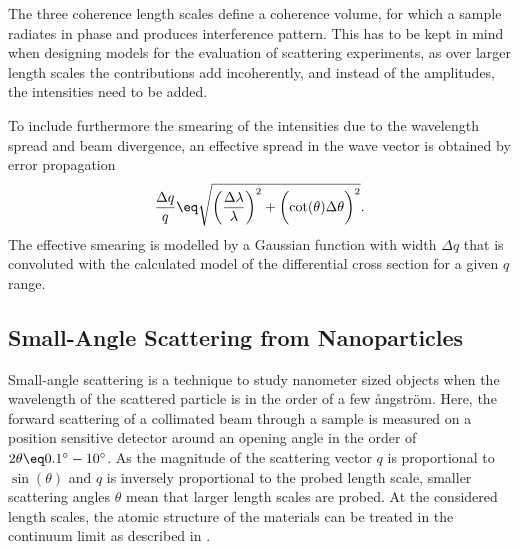 \documentclass[\main/dresen_thesis.tex]{subfiles}
\begin{document}
The three coherence length scales define a coherence volume, for which a sample radiates in phase and produces interference pattern.
This has to be kept in mind when designing models for the evaluation of scattering experiments, as over larger length scales the contributions add incoherently, and instead of the amplitudes, the intensities need to be added.

To include furthermore the smearing of the intensities due to the wavelength spread and beam divergence, an effective spread in the wave vector is obtained by error propagation
\begin{align}
  \frac{\Delta q}{q} \eq \sqrt{\biggl( \frac{\Delta \lambda}{\lambda} \biggr)^2 + \biggl( \cot (\theta) \Delta \theta \biggr)^2}.
\end{align}
The effective smearing is modelled by a Gaussian function with width $\Delta q$ that is convoluted with the calculated model of the differential cross section for a given $q$ range.

\subsection{Small-Angle Scattering from Nanoparticles}\label{sec:theoreticalBackground:scattering:SASNanoparticles}
Small-angle scattering is a technique to study nanometer sized objects when the wavelength of the scattered particle is in the order of a few {\aa}ngstr\"om.
Here, the forward scattering of a collimated beam through a sample is measured on a position sensitive detector around an opening angle in the order of $2 \theta \eq 0.1^\circ - 10^\circ$.
As the magnitude of the scattering vector $q$ is proportional to $\sin(\theta)$ and $q$ is inversely proportional to the probed length scale, smaller scattering angles $\theta$ mean that larger length scales are probed.
At the considered length scales, the atomic structure of the materials can be treated in the continuum limit as described in .
\end{document}
